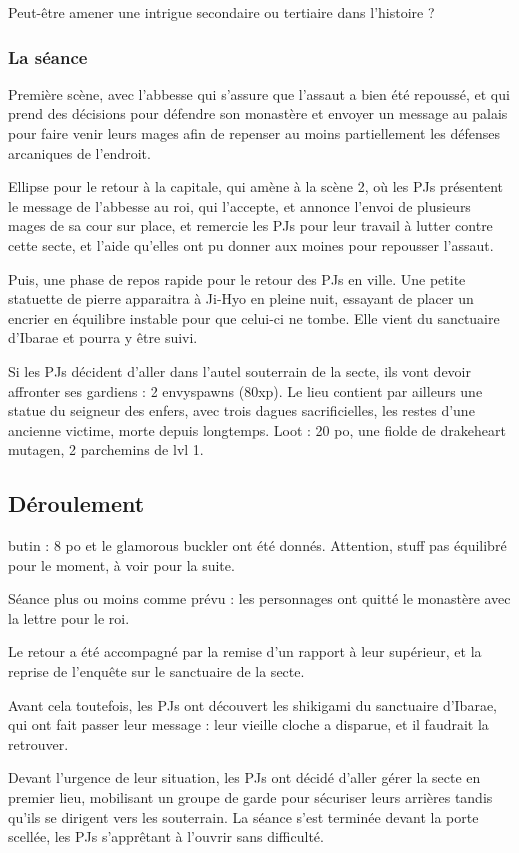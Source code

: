 \documentclass[10pt,a4paper]{book}
\begin{document}
Peut-être amener une intrigue secondaire ou tertiaire dans l'histoire ?
\subsubsection{La séance}
Première scène, avec l'abbesse qui s'assure que l'assaut a bien été repoussé, et qui prend des décisions pour défendre son monastère et envoyer un message au palais pour faire venir leurs mages afin de repenser au moins partiellement les défenses arcaniques de l'endroit.

Ellipse pour le retour à la capitale, qui amène à la scène 2, où les PJs présentent le message de l'abbesse au roi, qui l'accepte, et annonce l'envoi de plusieurs mages de sa cour sur place, et remercie les PJs pour leur travail à lutter contre cette secte, et l'aide qu'elles ont pu donner aux moines pour repousser l'assaut.

Puis, une phase de repos rapide pour le retour des PJs en ville. Une petite statuette de pierre apparaitra à Ji-Hyo en pleine nuit, essayant de placer un encrier en équilibre instable pour que celui-ci ne tombe. Elle vient du sanctuaire d'Ibarae et pourra y être suivi.

Si les PJs décident d'aller dans l'autel souterrain de la secte, ils vont devoir affronter ses gardiens : 2 envyspawns (80xp). Le lieu contient par ailleurs une statue du seigneur des enfers, avec trois dagues sacrificielles, les restes d'une ancienne victime, morte depuis longtemps. Loot : 20 po, une fiolde de drakeheart mutagen, 2 parchemins de lvl 1.


\subsection{Déroulement}
butin : 8 po et le glamorous buckler ont été donnés. Attention, stuff pas équilibré pour le moment, à voir pour la suite.

Séance plus ou moins comme prévu : les personnages ont quitté le monastère avec la lettre pour le roi. 

Le retour a été accompagné par la remise d'un rapport à leur supérieur, et la reprise de l'enquête sur le sanctuaire de la secte.

Avant cela toutefois, les PJs ont découvert les shikigami du sanctuaire d'Ibarae, qui ont fait passer leur message : leur vieille cloche a disparue, et il faudrait la retrouver.

Devant l'urgence de leur situation, les PJs ont décidé d'aller gérer la secte en premier lieu, mobilisant un groupe de garde pour sécuriser leurs arrières tandis qu'ils se dirigent vers les souterrain. La séance s'est terminée devant la porte scellée, les PJs s'apprêtant à l'ouvrir sans difficulté.
\end{document}
